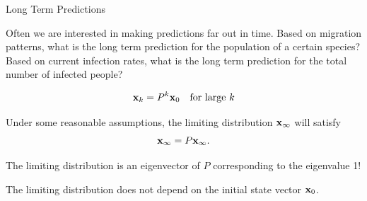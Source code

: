 \documentclass[xcolor=dvipsnames,aspectratio=169,t]{beamer}
\begin{document}
\begin{frame}{Long Term Predictions}
  \smallskip

  Often we are interested in making predictions far out in time.
  \bi
  \ii Based on migration patterns, what is the long term prediction for the population of a certain species?
  \ii Based on current infection rates, what is the long term prediction for the total number of infected people?
  \ei

  \[ \mathbf{x}_k = P^k \mathbf{x}_0 \quad \mbox{for large } k \]
  \vspace*{-.2em}

  \pause
  Under some reasonable assumptions,
  the limiting distribution $\mathbf{x}_\infty$ will satisfy
  \[ \mathbf{x}_\infty = P \mathbf{x}_\infty. \]

  \pause
  The limiting distribution is an \alert{eigenvector} of $P$ corresponding to the \alert{eigenvalue 1!}
  \medskip

  \pause
  The limiting distribution does \alert{not} depend on the initial state vector $\mathbf{x}_0$.
\end{frame}
\end{document}
